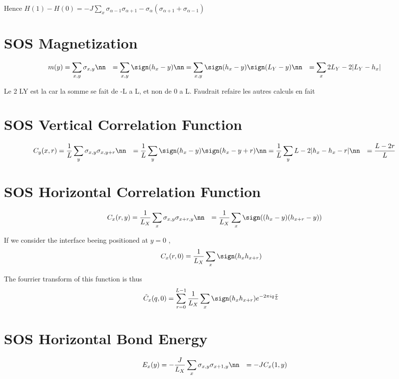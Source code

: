 Hence
$H(1) - H(0) = - J \sum_x \sigma_{\alpha-1} \sigma_{\alpha+1} - \sigma_\alpha (\sigma_{\alpha+1} + \sigma_{\alpha-1})$

\section{SOS Magnetization}

\begin{align*}
    m(y) &= \sum_{x,y} \sigma_{x,y} \nn
    &= \sum_{x,y} \sign(h_x-y) \nn
    &= \sum_{x,y} \sign(h_x-y) \sign(L_Y - y) \nn
    &= \sum_x 2 L_Y - 2 |L_Y - h_x|
\end{align*}

Le 2 LY est la car la somme se fait de -L a L, et non de 0 a L. Faudrait refaire les autres calculs en fait

\section{SOS Vertical Correlation Function}

\begin{align*}
    C_y(x,r) &= \frac{1}{L} \sum_y \sigma_{x,y} \sigma_{x,y+r} \nn
    &= \frac{1}{L} \sum_y \sign(h_x-y) \sign(h_x-y+r) \nn
    &= \frac{1}{L} \sum_y L-2 |h_x - h_x -r| \nn
    &= \frac{L - 2r}{L}
\end{align*}


\section{SOS Horizontal Correlation Function}

\begin{align*}
    C_x(r,y) &= \frac{1}{L_X} \sum_{x} \sigma_{x,y} \sigma_{x+r,y} \nn
    &= \frac{1}{L_X} \sum_x \sign( (h_x -y)(h_{x+r} -y))
\end{align*}

If we consider the interface beeing positioned at $y=0$ ,
\begin{align*}
    C_x(r,0) &= \frac{1}{L_X} \sum_x \sign(h_x h_{x+r})
\end{align*}

The fourrier transform of this function is thus
\begin{align*}
    \tilde{C}_x(q,0) &= \sum_{r=0}^{L-1} \frac{1}{L_X} \sum_x \sign(h_x h_{x+r}) e^{-2\pi i q \frac{r}{L}}
\end{align*}


\section{SOS Horizontal Bond Energy}
\begin{align*}
    E_x(y) &= - \frac{J}{L_X} \sum_x \sigma_{x,y} \sigma_{x+1,y} \nn
    &= -J C_x(1,y)
\end{align*}

